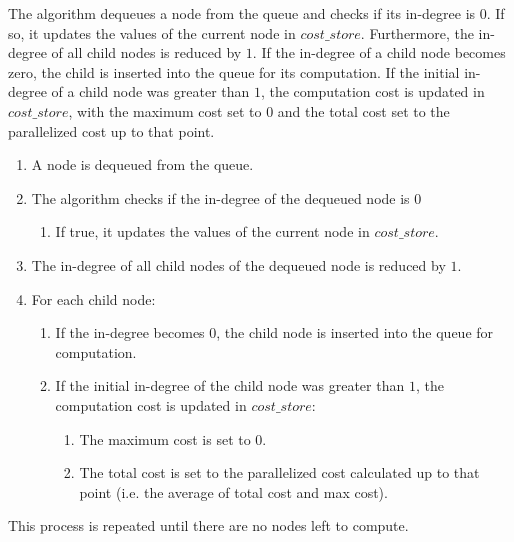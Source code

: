 \documentclass[12pt,a4paper,twoside,openright,bibliography=totocnumbered]{report}
\begin{document}
The algorithm dequeues a node from the queue and checks if its in-degree is $0$. If so, it updates the values of the current node in $cost\_store$. Furthermore, the in-degree of all child nodes is reduced by $1$. If the in-degree of a child node becomes zero, the child is inserted into the queue for its computation. If the initial in-degree of a child node was greater than $1$, the computation cost is updated in $cost\_store$, with the maximum cost set to $0$ and the total cost set to the parallelized cost up to that point.
\begin{enumerate}
    \item A node is dequeued from the queue.
    \item The algorithm checks if the in-degree of the dequeued node is $0$
    \begin{enumerate}
        \item If true, it updates the values of the current node in $cost\_store$.
    \end{enumerate}
    \item The in-degree of all child nodes of the dequeued node is reduced by $1$.
    \item For each child node:
    \begin{enumerate}
        \item If the in-degree becomes $0$, the child node is inserted into the queue for computation.
        \item If the initial in-degree of the child node was greater than $1$, the computation cost is updated in $cost\_store$:
        \begin{enumerate}
            \item The maximum cost is set to $0$.
            \item The total cost is set to the parallelized cost calculated up to that point (i.e. the average of total cost and max cost).
        \end{enumerate}
    \end{enumerate}
\end{enumerate}
This process is repeated until there are no nodes left to compute.
\end{document}
